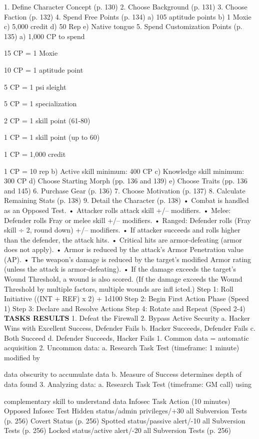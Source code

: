 1. Define Character Concept (p. 130)
2. Choose Background (p. 131)
3. Choose Faction (p. 132)
4. Spend Free Points (p. 134)
a) 105 aptitude points
b) 1 Moxie
c) 5,000 credit
d) 50 Rep
e) Native tongue
5. Spend Customization Points (p. 135)
a) 1,000 CP to spend
 

15 CP = 1 Moxie
 

10 CP = 1 aptitude point
 

5 CP = 1 psi sleight
 

5 CP = 1 specialization
 

2 CP = 1 skill point (61-80)
 

1 CP = 1 skill point (up to 60)
 

1 CP = 1,000 credit
 

1 CP = 10 rep
b) Active skill minimum: 400 CP
c) Knowledge skill minimum: 300 CP
d) Choose Starting Morph (pp. 136 and 139)
e) Choose Traits (pp. 136 and 145)
6. Purchase Gear (p. 136)
7. Choose Motivation (p. 137) 
8. Calculate Remaining Stats (p. 138)
9. Detail the Character (p. 138)
•  Combat is handled as an Opposed Test.
•  Attacker rolls attack skill +/– modifiers.
•  Melee: Defender rolls Fray or melee skill 
+/– modifiers.
•  Ranged: Defender rolls (Fray skill ÷ 2, 
round down) +/– modifiers.
•  If attacker succeeds and rolls higher than 
the defender, the attack hits.
•  Critical hits are armor-defeating (armor 
does not apply).
•  Armor is reduced by the attack's Armor 
Penetration value (AP).
•  The weapon's damage is reduced by the 
target's modified Armor rating (unless 
the attack is armor-defeating).
•  If the damage exceeds the target's 
Wound Threshold, a wound is also scored. 
(If the damage exceeds the Wound 
Threshold by multiple factors, multiple 
wounds are inﬂ icted.)
Step 1: Roll Initiative ((INT + REF) x 2) + 1d100
Step 2: Begin First Action Phase (Speed 1)
Step 3: Declare and Resolve Actions
Step 4: Rotate and Repeat (Speed 2-4)
\textbf{TASKS RESULTS}
1. Defeat the Firewall 
2. Bypass Active Security 
  a. Hacker Wins with Excellent Success, Defender Fails 
  b. Hacker Succeeds, Defender Fails 
  c. Both Succeed 
  d. Defender Succeeds, Hacker Fails 
1. Common data = automatic acquisition
2. Uncommon data:
  a. Research Task Test (timeframe: 1 minute) modified by 

data obscurity to accumulate data
  b. Measure of Success determines depth of data found
3. Analyzing data:
  a. Research Task Test (timeframe: GM call) using 

complementary skill to understand data
Infosec Task Action (10 minutes)
Opposed Infosec Test
Hidden status/admin privileges/+30 all Subversion Tests (p. 256)
Covert Status (p. 256)
Spotted status/passive alert/-10 all Subversion Tests (p. 256)
Locked status/active alert/-20 all Subversion Tests (p. 256) 

